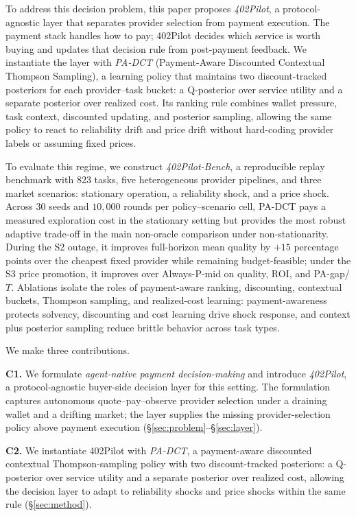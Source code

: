 To address this decision problem, this paper proposes \emph{402Pilot}, a protocol-agnostic layer that separates provider selection from payment execution. The payment stack handles how to pay; 402Pilot decides which service is worth buying and updates that decision rule from post-payment feedback. We instantiate the layer with \emph{PA-DCT} (Payment-Aware Discounted Contextual Thompson Sampling), a learning policy that maintains two discount-tracked posteriors for each provider--task bucket: a Q-posterior over service utility and a separate posterior over realized cost. Its ranking rule combines wallet pressure, task context, discounted updating, and posterior sampling, allowing the same policy to react to reliability drift and price drift without hard-coding provider labels or assuming fixed prices.

To evaluate this regime, we construct \emph{402Pilot-Bench}, a reproducible replay benchmark with $823$ tasks, five heterogeneous provider pipelines, and three market scenarios: stationary operation, a reliability shock, and a price shock. Across $30$ seeds and $10{,}000$ rounds per policy--scenario cell, PA-DCT pays a measured exploration cost in the stationary setting but provides the most robust adaptive trade-off in the main non-oracle comparison under non-stationarity. During the S2 outage, it improves full-horizon mean quality by $+15$ percentage points over the cheapest fixed provider while remaining budget-feasible; under the S3 price promotion, it improves over Always-P-mid on quality, ROI, and PA-gap/$T$. Ablations isolate the roles of payment-aware ranking, discounting, contextual buckets, Thompson sampling, and realized-cost learning: payment-awareness protects solvency, discounting and cost learning drive shock response, and context plus posterior sampling reduce brittle behavior across task types.

We make three contributions.

\textbf{C1.} We formulate \emph{agent-native payment decision-making} and introduce \emph{402Pilot}, a protocol-agnostic buyer-side decision layer for this setting. The formulation captures autonomous quote--pay--observe provider selection under a draining wallet and a drifting market; the layer supplies the missing provider-selection policy above payment execution (\S\ref{sec:problem}--\S\ref{sec:layer}).

\textbf{C2.} We instantiate 402Pilot with \emph{PA-DCT}, a payment-aware discounted contextual Thompson-sampling policy with two discount-tracked posteriors: a Q-posterior over service utility and a separate posterior over realized cost, allowing the decision layer to adapt to reliability shocks and price shocks within the same rule (\S\ref{sec:method}).

